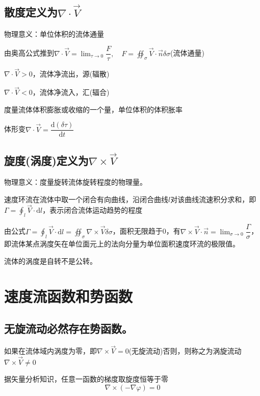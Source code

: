 \documentclass[a4paper,oneside]{ctexbook}
\begin{document}
\subsection{散度定义为\(\nabla\cdot\overrightarrow{V}\)}

物理意义：单位体积的流体通量

由奥高公式推到\(\nabla\cdot\overrightarrow{V}=\lim_{\tau\to0}\limits\dfrac{F}{\tau},\quad{}F=\oiint_\sigma\overrightarrow{V}\cdot\overrightarrow{n}\delta\sigma\)(流体通量)

\(\nabla\cdot\overrightarrow{V}>0\)，流体净流出，源(辐散)

\(\nabla\cdot\overrightarrow{V}<0\)，流体净流入，汇(辐合)

度量流体体积膨胀或收缩的一个量，单位体积的体积胀率

体形变\(\nabla\cdot\overrightarrow{V}=\dfrac{\mathrm{d}(\delta\tau)}{\mathrm{d}t}\)

\subsection{旋度(涡度)定义为\(\nabla\times\overrightarrow{V}\)}

物理意义：度量旋转流体旋转程度的物理量。

速度环流在流体中取一个闭合有向曲线，沿闭合曲线\(l\)对该曲线流速积分求和，即\(\Gamma=\oint_l\overrightarrow{V}\cdot\mathrm{d}l\)，表示闭合流体运动趋势的程度

由公式\(\Gamma=\oint_l\overrightarrow{V}\cdot\mathrm{d}l=\oiint_\sigma\nabla\times\overrightarrow{V}\delta\sigma\)，面积无限趋于0，有\(\nabla\times\overrightarrow{V}\cdot\overrightarrow{n}=\lim_{\sigma\to0}\limits\dfrac{\Gamma}{\sigma}\)，即流体某点涡度矢在单位面元上的法向分量为单位面积速度环流的极限值。

流体的涡度是自转不是公转。

\section{速度流函数和势函数}

\subsection{无旋流动必然存在势函数。}

如果在流体域内涡度为零，即\(\nabla\times\overrightarrow{V}=0\)(无旋流动)否则，则称之为涡旋流动\(\nabla\times\overrightarrow{V}\ne0\)

据矢量分析知识，任意一函数的梯度取旋度恒等于零\begin{equation}\nabla\times(-\nabla\varphi)=0\end{equation}
\end{document}
